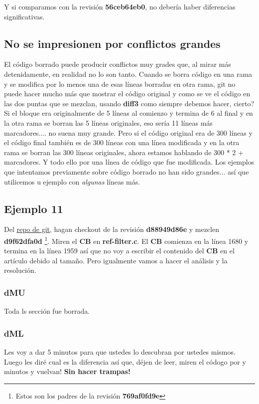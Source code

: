 Y si comparamos con la revisión {\bf 56ceb64eb0}, no debería haber diferencias significativas.

\subsection{No se impresionen por conflictos grandes}
El código borrado puede producir conflictos muy grades que, al mirar más detenidamente, en realidad no lo son tanto.
Cuando se borra código en una rama y se modifica por lo menos una de esas líneas borradas en otra rama, git no puede
hacer mucho más que mostrar el código original y como se ve el código en las dos puntas que se mezclan, usando {\bf diff3}
como siempre debemos hacer, cierto? Si el bloque era originalmente de 5 líneas al comienzo y termina de 6 al final y en la
otra rama se borran las 5 líneas originales, eso sería 11 líneas más marcadores.... no suena muy grande. Pero si el código
original era de 300 líneas y el código final también es de 300 líneas con una línea modificada y en la otra rama se borran las
300 líneas originales, ahora estamos hablando de 300 * 2 + marcadores. Y todo ello por una línea de código que fue modificada.
Los ejemplos que intentamos previamente sobre código borrado no han sido grandes... así que utilicemos u ejemplo con {\it algunas}
líneas más.

\subsection{Ejemplo 11}

Del \hyperref[git_repo]{repo de git}, hagan checkout de la revisión {\bf d88949d86e} y mezclen {\bf d9f62dfa0d}
\footnote{Estos son los padres de la revisión {\bf 769af0fd9e}}. Miren el {\bf CB} en {\bf ref-filter.c}. El {\bf CB} comienza en la
línea 1680 y termina en la línea 1959 así que no voy a escribir el contenido del {\bf CB} en el artículo debido al tamaño.
Pero igualmente vamos a hacer el análisis y la resolución.

\subsubsection{dMU}
Toda ls sección fue borrada.

\subsubsection{dML}
Les voy a dar 5 minutos para que ustedes lo descubran por ustedes mismos. Luego les diré cual es la diferencia así que,
déjen de leer, miren el códogo por y minutos y vuelvan! {\bf Sin hacer trampas!}


